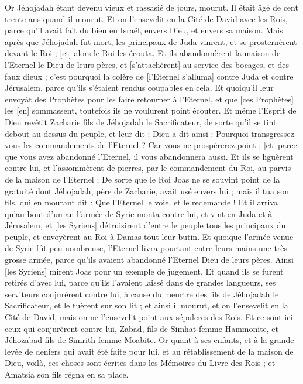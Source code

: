 \begin{multicols}{2}
Or Jéhojadah étant devenu vieux et rassasié de jours, mourut. Il était âgé de cent trente ans quand il mourut.
Et on l'ensevelit en la Cité de David avec les Rois, parce qu'il avait fait du bien en Israël, envers Dieu, et envers sa maison.
Mais après que Jéhojadah fut mort, les principaux de Juda vinrent, et se prosternèrent devant le Roi ; [et] alors le Roi les écouta.
Et ils abandonnèrent la maison de l'Eternel le Dieu de leurs pères, et [s'attachèrent] au service des bocages, et des faux dieux ; c'est pourquoi la colère de [l'Eternel s'alluma] contre Juda et contre Jérusalem, parce qu'ils s'étaient rendus coupables en cela.
Et quoiqu'il leur envoyât des Prophètes pour les faire retourner à l'Eternel, et que [ces Prophètes] les [en] sommassent, toutefois ils ne voulurent point écouter.
Et même l'Esprit de Dieu revêtit Zacharie fils de Jéhojadah le Sacrificateur, de sorte qu'il se tint debout au dessus du peuple, et leur dit : Dieu a dit ainsi : Pourquoi transgressez-vous les commandements de l'Eternel ? Car vous ne prospérerez point ; [et] parce que vous avez abandonné l'Eternel, il vous abandonnera aussi.
Et ils se liguèrent contre lui, et l'assommèrent de pierres, par le commandement du Roi, au parvis de la maison de l'Eternel ;
De sorte que le Roi Joas ne se souvint point de la gratuité dont Jéhojadah, père de Zacharie, avait usé envers lui ; mais il tua son fils, qui en mourant dit : Que l'Eternel le voie, et le redemande !
Et il arriva qu'au bout d'un an l'armée de Syrie monta contre lui, et vint en Juda et à Jérusalem, et [les Syriens] détruisirent d'entre le peuple tous les principaux du peuple, et envoyèrent au Roi à Damas tout leur butin.
Et quoique l'armée venue de Syrie fût peu nombreuse, l'Eternel livra pourtant entre leurs mains une très-grosse armée, parce qu'ils avaient abandonné l'Eternel Dieu de leurs pères. Ainsi [les Syriens] mirent Joas pour un exemple de jugement.
Et quand ils se furent retirés d'avec lui, parce qu'ils l'avaient laissé dans de grandes langueurs, ses serviteurs conjurèrent contre lui, à cause du meurtre des fils de Jéhojadah le Sacrificateur, et le tuèrent sur son lit ; et ainsi il mourut, et on l'ensevelit en la Cité de David, mais on ne l'ensevelit point aux sépulcres des Rois.
Et ce sont ici ceux qui conjurèrent contre lui, Zabad, fils de Simhat femme Hammonite, et Jéhozabad fils de Simrith femme Moabite.
Or quant à ses enfants, et à la grande levée de deniers qui avait été faite pour lui, et au rétablissement de la maison de Dieu, voilà, ces choses sont écrites dans les Mémoires du Livre des Rois ; et Amatsia son fils régna en sa place.

\end{multicols}
